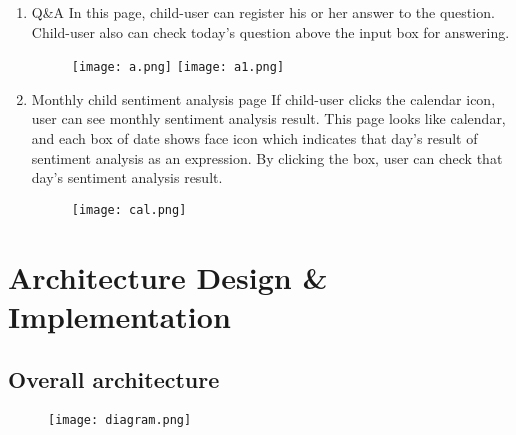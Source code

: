 \documentclass[conference]{IEEEtran}
\begin{document}
\begin{enumerate}
\begin{enumerate}
\begin{enumerate}
            \end{enumerate}
            \newpage
            \item Q\&A \hfill\break
            In this page, child-user can register his or her answer to the question. Child-user also can check today’s question above the input box for answering.
            \begin{figure}[H]
                 \centering
                 \texttt{[image: a.png]}
                 \texttt{[image: a1.png]}
                 \end{figure}
            \item Monthly child sentiment analysis page \hfill \break
            If child-user clicks the calendar icon, user can see monthly sentiment analysis result. This page looks like calendar, and each box of date shows face icon which indicates that day’s result of sentiment analysis as an expression. By clicking the box, user can check that day’s sentiment analysis result.
            \begin{figure}[H]
             \centering
             \texttt{[image: cal.png]}
             \end{figure}
        \end{enumerate}
        \end{enumerate}
\newpage
\section{\large{Architecture Design \& Implementation}}
\subsection{Overall architecture}
\begin{figure}[H]
                 \centering
                 \texttt{[image: diagram.png]}
                 \end{figure}
                
\end{document}

